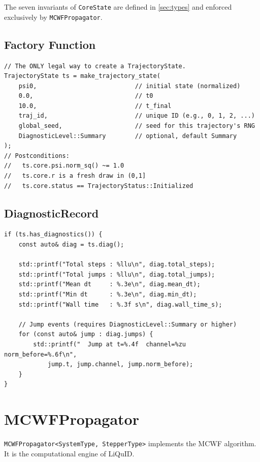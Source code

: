 \documentclass[11pt,a4paper,twoside]{book}
\newcommand{\code}[1]{\texttt{\small#1}}
\theoremstyle{definition}
\theoremstyle{remark}
\begin{document}
The seven invariants of \code{CoreState} are defined in
\cref{sec:types} and enforced exclusively by \code{MCWFPropagator}.

\subsection{Factory Function}
\label{subsec:trajectory-factory}

\begin{verbatim}
// The ONLY legal way to create a TrajectoryState.
TrajectoryState ts = make_trajectory_state(
    psi0,                           // initial state (normalized)
    0.0,                            // t0
    10.0,                           // t_final
    traj_id,                        // unique ID (e.g., 0, 1, 2, ...)
    global_seed,                    // seed for this trajectory's RNG
    DiagnosticLevel::Summary        // optional, default Summary
);
// Postconditions:
//   ts.core.psi.norm_sq() ~= 1.0
//   ts.core.r is a fresh draw in (0,1]
//   ts.core.status == TrajectoryStatus::Initialized
\end{verbatim}

\subsection{DiagnosticRecord}
\label{subsec:diagnostic-record}

\begin{verbatim}
if (ts.has_diagnostics()) {
    const auto& diag = ts.diag();

    std::printf("Total steps : %llu\n", diag.total_steps);
    std::printf("Total jumps : %llu\n", diag.total_jumps);
    std::printf("Mean dt     : %.3e\n", diag.mean_dt);
    std::printf("Min dt      : %.3e\n", diag.min_dt);
    std::printf("Wall time   : %.3f s\n", diag.wall_time_s);

    // Jump events (requires DiagnosticLevel::Summary or higher)
    for (const auto& jump : diag.jumps) {
        std::printf("  Jump at t=%.4f  channel=%zu  norm_before=%.6f\n",
            jump.t, jump.channel, jump.norm_before);
    }
}
\end{verbatim}

\section{MCWFPropagator}
\label{sec:mcwf-propagator}

\code{MCWFPropagator<SystemType, StepperType>} implements the
MCWF algorithm. It is the computational engine of LiQuID.
\end{document}
